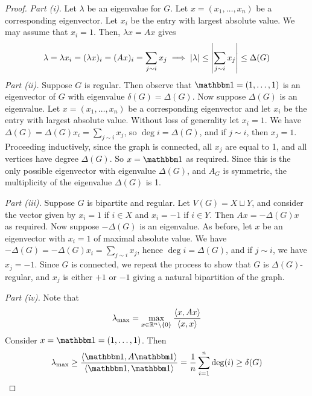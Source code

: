 \begin{proof}
	\emph{Part (i).}
	Let \( \lambda \) be an eigenvalue for \( G \).
	Let \( x = (x_1, \dots, x_n) \) be a corresponding eigenvector.
	Let \( x_i \) be the entry with largest absolute value.
	We may assume that \( x_i = 1 \).
	Then, \( \lambda x = Ax \) gives
	\[ \lambda = \lambda x_i = (\lambda x)_i = (Ax)_i = \sum_{j \sim i} x_j \implies \abs{\lambda} \leq \abs{\sum_{j \sim i} x_j} \leq \Delta(G) \]
	\emph{Part (ii).}
	Suppose \( G \) is regular.
	Then observe that \( \mathbbm 1 = (1, \dots, 1) \) is an eigenvector of \( G \) with eigenvalue \( \delta(G) = \Delta(G) \).
	Now suppose \( \Delta(G) \) is an eigenvalue.
	Let \( x = (x_1, \dots, x_n) \) be a corresponding eigenvector and let \( x_i \) be the entry with largest absolute value.
	Without loss of generality let \( x_i = 1 \).
	We have \( \Delta(G) = \Delta(G) x_i = \sum_{j \sim i} x_j \), so \( \deg i = \Delta(G) \), and if \( j \sim i \), then \( x_j = 1 \).
	Proceeding inductively, since the graph is connected, all \( x_j \) are equal to 1, and all vertices have degree \( \Delta(G) \).
	So \( x = \mathbbm 1 \) as required.
	Since this is the only possible eigenvector with eigenvalue \( \Delta(G) \), and \( A_G \) is symmetric, the multiplicity of the eigenvalue \( \Delta(G) \) is 1.

	\emph{Part (iii).}
	Suppose \( G \) is bipartite and regular.
	Let \( V(G) = X \sqcup Y \), and consider the vector given by \( x_i = 1 \) if \( i \in X \) and \( x_i = -1 \) if \( i \in Y \).
	Then \( Ax = -\Delta(G) x \) as required.
	Now suppose \( -\Delta(G) \) is an eigenvalue.
	As before, let \( x \) be an eigenvector with \( x_i = 1 \) of maximal absolute value.
	We have \( -\Delta(G) = -\Delta(G) x_i = \sum_{j \sim i} x_j \), hence \( \deg i = \Delta(G) \), and if \( j \sim i \), we have \( x_j = -1 \).
	Since \( G \) is connected, we repeat the process to show that \( G \) is \( \Delta(G) \)-regular, and \( x_j \) is either \( +1 \) or \( -1 \) giving a natural bipartition of the graph.

	\emph{Part (iv).}
	Note that
	\[ \lambda_{\mathrm{max}} = \max_{x \in \mathbb R^n \setminus \qty{0}} \frac{\left\langle{x, Ax}\right\rangle}{\left\langle{x,x}\right\rangle} \]
	Consider \( x = \mathbbm 1 = (1, \dots, 1) \).
	Then
	\[ \lambda_{\mathrm{max}} \geq \frac{\inner{\mathbbm 1, A\mathbbm 1}}{\inner{\mathbbm 1, \mathbbm 1}} = \frac{1}{n} \sum_{i=1}^n \deg(i) \geq \delta(G) \]
\end{proof}

